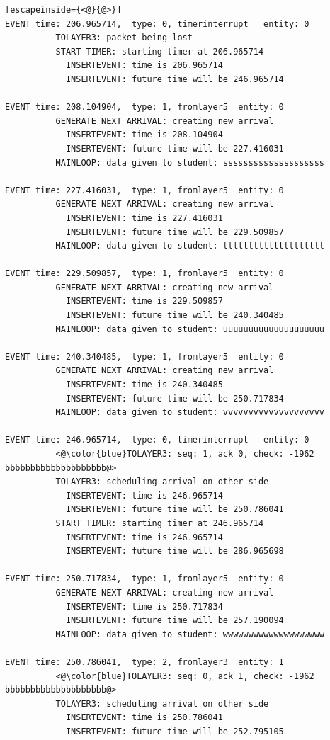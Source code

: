 \documentclass[paper=a4, fontsize=11pt]{scrartcl}
\numberwithin{equation}{section}		%
\numberwithin{figure}{section}			%
\numberwithin{table}{section}				%
\begin{document}
\begin{lstlisting}[escapeinside={<@}{@>}]
EVENT time: 206.965714,  type: 0, timerinterrupt   entity: 0
          TOLAYER3: packet being lost
          START TIMER: starting timer at 206.965714
            INSERTEVENT: time is 206.965714
            INSERTEVENT: future time will be 246.965714

EVENT time: 208.104904,  type: 1, fromlayer5  entity: 0
          GENERATE NEXT ARRIVAL: creating new arrival
            INSERTEVENT: time is 208.104904
            INSERTEVENT: future time will be 227.416031
          MAINLOOP: data given to student: ssssssssssssssssssss

EVENT time: 227.416031,  type: 1, fromlayer5  entity: 0
          GENERATE NEXT ARRIVAL: creating new arrival
            INSERTEVENT: time is 227.416031
            INSERTEVENT: future time will be 229.509857
          MAINLOOP: data given to student: tttttttttttttttttttt

EVENT time: 229.509857,  type: 1, fromlayer5  entity: 0
          GENERATE NEXT ARRIVAL: creating new arrival
            INSERTEVENT: time is 229.509857
            INSERTEVENT: future time will be 240.340485
          MAINLOOP: data given to student: uuuuuuuuuuuuuuuuuuuu

EVENT time: 240.340485,  type: 1, fromlayer5  entity: 0
          GENERATE NEXT ARRIVAL: creating new arrival
            INSERTEVENT: time is 240.340485
            INSERTEVENT: future time will be 250.717834
          MAINLOOP: data given to student: vvvvvvvvvvvvvvvvvvvv

EVENT time: 246.965714,  type: 0, timerinterrupt   entity: 0
          <@\color{blue}TOLAYER3: seq: 1, ack 0, check: -1962 bbbbbbbbbbbbbbbbbbbb@>
          TOLAYER3: scheduling arrival on other side
            INSERTEVENT: time is 246.965714
            INSERTEVENT: future time will be 250.786041
          START TIMER: starting timer at 246.965714
            INSERTEVENT: time is 246.965714
            INSERTEVENT: future time will be 286.965698

EVENT time: 250.717834,  type: 1, fromlayer5  entity: 0
          GENERATE NEXT ARRIVAL: creating new arrival
            INSERTEVENT: time is 250.717834
            INSERTEVENT: future time will be 257.190094
          MAINLOOP: data given to student: wwwwwwwwwwwwwwwwwwww

EVENT time: 250.786041,  type: 2, fromlayer3  entity: 1
          <@\color{blue}TOLAYER3: seq: 0, ack 1, check: -1962 bbbbbbbbbbbbbbbbbbbb@>
          TOLAYER3: scheduling arrival on other side
            INSERTEVENT: time is 250.786041
            INSERTEVENT: future time will be 252.795105


\end{lstlisting}
\end{document}
